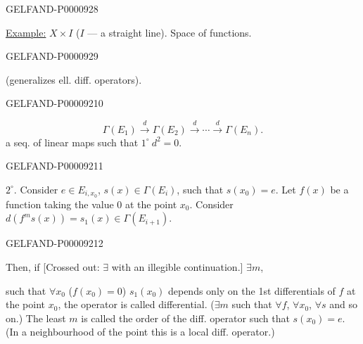 \begin{GelfandAdjacentEvidence}{GELFAND-P000092}{8}

\underline{Example:} $X\times I$ ($I$ — a straight line). Space of functions.
\end{GelfandAdjacentEvidence}
\begin{GelfandAdjacentEvidence}{GELFAND-P000092}{9}

 (generalizes ell. diff. operators).
\end{GelfandAdjacentEvidence}
\begin{GelfandAdjacentEvidence}{GELFAND-P000092}{10}

\begin{equation*}
\Gamma(E_1)\overset d\longrightarrow\Gamma(E_2)\overset d\longrightarrow
\cdots\overset d\longrightarrow\Gamma(E_n).
\end{equation*}
a seq. of linear maps such that $1^\circ\ d^2=0$.
\end{GelfandAdjacentEvidence}
\begin{GelfandAdjacentEvidence}{GELFAND-P000092}{11}

$2^\circ$. Consider $e\in E_{i,x_0}$, $s(x)\in\Gamma(E_i)$, such that $s(x_0)=e$.
Let $f(x)$ be a function taking the value $0$ at the point $x_0$.
Consider $d(f^m s(x))=s_1(x)\in\Gamma(E_{i+1})$.
\end{GelfandAdjacentEvidence}
\begin{GelfandAdjacentEvidence}{GELFAND-P000092}{12}

Then, if
[Crossed out: $\exists$ with an illegible continuation.] $\exists m$,

such that $\forall x_0$ ($f(x_0)=0$) $s_1(x_0)$ depends only on the 1st differentials of $f$
at the point $x_0$, the operator is called differential.
($\exists m$ such that $\forall f$, $\forall x_0$, $\forall s$ and so on.)
The least $m$ is called the order of the diff. operator such that $s(x_0)=e$.
(In a neighbourhood of the point this is a local diff. operator.)
\end{GelfandAdjacentEvidence}
